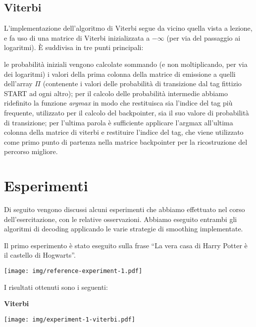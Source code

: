 \section{Viterbi}
L'implementazione dell'algoritmo di Viterbi segue da vicino quella vista a lezione, e fa uso di una matrice di Viterbi inizializzata a $-\infty$ (per via del passaggio ai logaritmi). È suddivisa in tre punti principali:
\begin{outline}[enumerate]
    \1 le probabilità iniziali vengono calcolate sommando (e non moltiplicando, per via dei logaritmi) i valori della prima colonna della matrice di emissione a quelli dell'array $\Pi$ (contenente i valori delle probabilità di transizione dal tag fittizio START ad ogni altro);
    \1 per il calcolo delle probabilità intermedie abbiamo ridefinito la funzione \textit{argmax} in modo che restituisca sia l'indice del tag più frequente, utilizzato per il calcolo del backpointer, sia il suo valore di probabilità di transizione;
    \1 per l'ultima parola è sufficiente applicare l'argmax all'ultima colonna della matrice di viterbi e restituire l'indice del tag, che viene utilizzato come primo punto di partenza nella matrice backpointer per la ricostruzione del percorso migliore.
\end{outline}


\chapter{Esperimenti}
Di seguito vengono discussi alcuni esperimenti che abbiamo effettuato nel corso dell'esercitazione, con le relative osservazioni. Abbiamo eseguito entrambi gli algoritmi di decoding applicando le varie strategie di smoothing implementate.

Il primo esperimento è stato eseguito sulla frase ``La vera casa di Harry Potter è il castello di Hogwarts''.

\begin{outline}
    \begin{center}
     \texttt{[image: img/reference-experiment-1.pdf]}
    \end{center}
\end{outline}
 I risultati ottenuti sono i seguenti:
\newline
\newline
\centerline{\textbf{Viterbi}}
\begin{outline}
    \begin{center}
     \texttt{[image: img/experiment-1-viterbi.pdf]}
    \end{center}
\end{outline}

